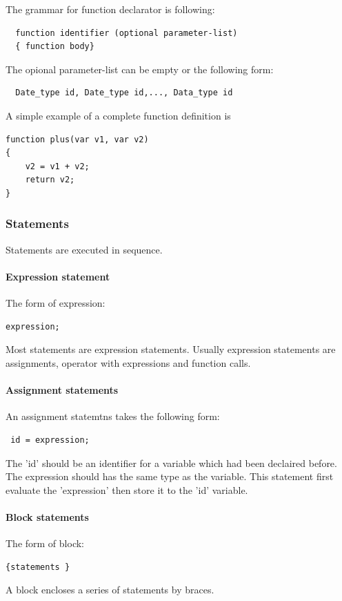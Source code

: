 \documentclass[12pt]{article} %
\begin{document}
The grammar for function declarator is following:
\begin{lstlisting}
  function identifier (optional parameter-list) 
  { function body} 
\end{lstlisting}
The opional parameter-list can be empty or the following form:
\begin{lstlisting}
  Date_type id, Date_type id,..., Data_type id
\end{lstlisting}
A simple example of a complete function definition is
\begin{lstlisting}[mathescape=true]
function plus(var v1, var v2)
{
	v2 = v1 + v2;
	return v2;
}
\end{lstlisting}


\subsubsection{Statements}
Statements are executed in sequence.

\paragraph{Expression statement}
The form of expression:
\begin{lstlisting}
expression;
\end{lstlisting}

\noindent Most statements are expression statements. Usually expression statements are assignments, operator with expressions and  function calls.
\paragraph{Assignment statements}
An assignment statemtns takes the following form:
\begin{lstlisting}
 id = expression;
\end{lstlisting}

The 'id' should be  an identifier for  a variable which had been declaired before. The expression should has the same type as the variable. This statement first evaluate the 'expression' then store it to the 'id' variable.  


\paragraph{Block statements}
The form of block:
\begin{lstlisting}
{statements }
\end{lstlisting}
\noindent A block encloses a series of statements by braces.
\end{document}
